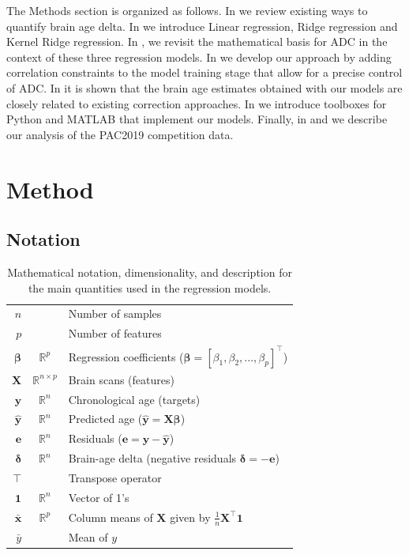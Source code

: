\documentclass[utf8]{frontiersSCNS} %
\renewcommand{\b}{\boldsymbol{\beta}} %
\renewcommand{\d}{\boldsymbol{\delta}}
\newcommand{\e}{\mathbf{e}}
\newcommand{\mx}{\mathbf{\bar{x}}}
\newcommand{\my}{\bar{y}}
\newcommand{\one}{\mathbf{1}}
\newcommand{\R}{\mathbb{R}}
\newcommand{\X}{\mathbf{X}}
\newcommand{\y}{\mathbf{y}}
\newcommand{\yh}{\mathbf{\hat{y}}}
\begin{document}
The Methods section is organized as follows. In  we review existing ways to quantify brain age delta. In  we introduce Linear regression, Ridge regression and Kernel Ridge regression. In , we revisit the mathematical basis for ADC in the context of these three regression models. In  we develop our approach by adding correlation constraints to the model training stage that allow for a precise control of ADC. In  it is shown that the brain age estimates obtained with our models are closely related to existing correction approaches. 
In  we introduce toolboxes for Python and MATLAB that implement our models. Finally, in  and  we describe our analysis of the PAC2019 competition data. 


\section{Method}
\subsection{Notation}

\begin{table}[htbp]\caption{Mathematical notation, dimensionality, and description for the main quantities used in the regression models.}
\begin{center}%
\begin{tabular}{r c p{10cm} }
\toprule
$n$ &  & Number of samples\\
$p$ &  & Number of features\\
$\b$ & $\R^p$ & Regression coefficients ($\b=[\beta_1,\beta_2,...,\beta_p]^\top$)\\
$\X$ & $\R^{n\times p}$ & Brain scans (features)\\
$\y$ & $\R^n$ & Chronological age (targets)\\
$\yh$ & $\R^n$ & Predicted age ($\yh = \X\b$)\\
$\e$ & $\R^n$ & Residuals ($\e=\y - \yh$) \\
$\d$ & $\R^n$ & Brain-age delta (negative residuals $\d =-\e$)\\
\midrule
$\top$ &  & Transpose operator\\
$\one$ & $\R^n$ & Vector of 1's\\
$\mx$ & $\R^p$ & Column means of $\X$ given by $\frac{1}{n}\X^\top\one$\\
$\my$ & & Mean of $y$\\
\bottomrule
\end{tabular}
\end{center}
\label{tab:notation}
\end{table}
\end{document}
